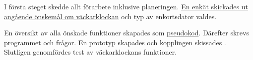 
I första steget skedde allt förarbete inklusive planeringen. \hyperref[sec:svar]{En enkät skickades ut angående önskemål om väckarklockan} och typ av enkortsdator valdes.

En översikt av alla önskade funktioner skapades som \hyperref[sec:psuedo]{pseudokod}. Därefter skrevs programmet och frågor. En prototyp skapades och kopplingen skissades%
. Slutligen genomfördes test av väckarklockans funktioner.
